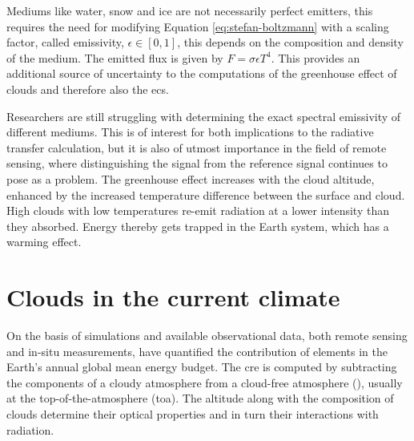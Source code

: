 Mediums like water, snow and ice are not necessarily perfect emitters, this requires the need for modifying Equation \eqref{eq:stefan-boltzmann} with a scaling factor, called emissivity, $\epsilon \in [0, 1]$,
this depends on the composition and density of the medium. The emitted flux is given by $ F = \sigma \epsilon T ^4$. This provides an additional source of uncertainty to the computations of the greenhouse effect of clouds and therefore also the \acrshort{ecs}.

Researchers are still struggling with determining the exact spectral emissivity of different mediums. This is of interest for both implications to the radiative transfer calculation, but it is also of utmost importance in the field of remote sensing, where distinguishing the signal from the reference signal continues to pose as a problem.
The greenhouse effect increases with the cloud altitude, enhanced by the increased temperature difference between the surface and cloud. High clouds with low temperatures re-emit radiation at a lower intensity than they absorbed. Energy thereby gets trapped in the Earth system, which has a warming effect. 
\section{Clouds in the current climate} \label{sec:intro_cloud_current_climate}
On the basis of simulations and available observational data, both remote sensing and in-situ measurements,  have quantified the contribution of elements in the Earth's annual global mean energy budget. The \acrfull{cre} is computed by subtracting the components of a cloudy atmosphere from a cloud-free atmosphere (\cite{RAMANATHAN1989}), usually at the top-of-the-atmosphere (\acrshort{toa}). The altitude along with the composition of clouds determine their optical properties and in turn their interactions with radiation.

